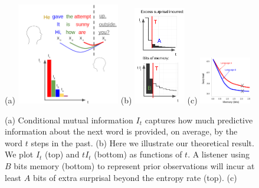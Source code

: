 \begin{figure}
	(a)
\includegraphics[width=0.4\textwidth]{figures-gdrive/mi-distance.png}
	(b)
\includegraphics[width=0.2\textwidth]{figures-gdrive/theorem.png}
	(c)
\includegraphics[width=0.2\textwidth]{figures-gdrive/tradeoff.png}
	\caption{
		(a) Conditional mutual information $I_t$ captures how much predictive information about the next word is provided, on average, by the word $t$ steps in the past.
		(b) Here we illustrate our theoretical result. We plot $I_t$ (top) and $tI_t$ (bottom) as functions of $t$. A listener using $B$ bits memory (bottom) to represent prior observations will incur at least $A$ bits of extra surprisal beyond the entropy rate (top). 
		(c)  
}\label{fig:theorem}
\end{figure}











